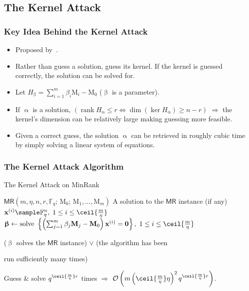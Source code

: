 \documentclass[serif, hyperref={unicode, breaklinks}, xcolor={x11names, psnames,
  dvipsnames, table}, usepdftitle=false]{beamer}
\DeclareMathOperator{\rank}{rank}
\newcommand{\MR}{\ensuremath{\mathsf{MR}}}
\renewcommand*{\vec}[1]{\bm{\mathrm{#1}}}
\newcommand{\matr}[1]{\bm{\mathrm{#1}}}
\begin{document}
\subsection{The Kernel Attack}
\begin{frame}
  \frametitle{Key Idea Behind the Kernel Attack}
  \begin{itemize}
  \item Proposed by~\textcite{GC00}.
  \item Rather than guess a solution, guess its kernel.  If the kernel is
    guessed correctly, the solution can be solved for.
  \item Let
    $H_{\vec{\upbeta}} = \sum\nolimits_{i = 1}^{m} \beta_i \matr{M}_i -
    \matr{M}_0$ ($\vec\upbeta$ is a parameter).
  \item If $\vec\upalpha$ is a solution,
    $\left(\rank H_{\vec\upalpha} \le r \Longleftrightarrow \dim\left(\ker
        H_{\vec\upalpha}\right) \ge n - r\right)$ $\Longrightarrow$ the kernel's
    dimension can be relatively large making guessing more feasible.
  \item Given a correct guess, the solution $\vec\upalpha$ can be retrieved in
    roughly cubic time by simply solving a linear system of equations.
  \end{itemize}
\end{frame}
\begin{frame}
  \frametitle{The Kernel Attack Algorithm}
  \begin{algorithm}[H]
    \renewcommand{\algorithmicrequire}{\textbf{Input:}}
    \renewcommand{\algorithmicensure}{\textbf{Output:}}
    \caption{The Kernel Attack on MinRank}\label{alg:ka}
    \begin{algorithmic}
      \Require $\MR\left(m, \eta, n, r, \mathbb{F}_q;\, \matr{M}_0;\,
        \matr{M}_1, \ldots, \matr{M}_m\right)$
      \Ensure A solution to the \MR{} instance (if any)
      \Repeat
      \State $\vec{x}^{(i)} \sample \mathbb{F}_q^n,\; 1 \le i \le \ceil{\frac m
        \eta}$
      \State $\vec{\upbeta} \gets \text{solve
      }\left\{\left(\sum\nolimits_{j=1}^{m}\beta_j \matr{M}_j -
          \matr{M}_0\right)\vec{x}^{(i)} = \vec{0} \right\},\; 1 \le i \le
      \ceil{\frac m \eta}$
      \Until \begin{varwidth}[t]{\linewidth}
        ($\vec{\upbeta}$ solves the \MR{} instance) $\vee$ (the algorithm has been
        \par run sufficiently many times)
      \end{varwidth}
    \end{algorithmic}
  \end{algorithm}
  Guess \& solve $q^{\ceil{\frac m \eta} r}$ times $\Longrightarrow$
  $\mathcal{O}\left(m \left(\ceil{\frac m \eta} \eta\right)^2 q^{\ceil{\frac m
        \eta} r}\right)$.
\end{frame}
\end{document}
